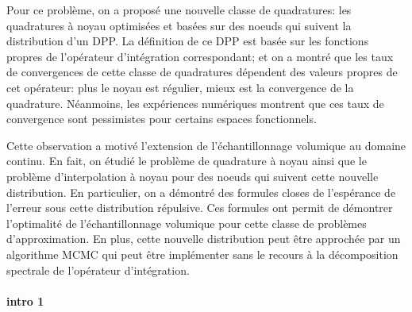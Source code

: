 \documentclass[twoside,11pt]{book}
\numberwithin{theorem}{chapter}
\numberwithin{definition}{chapter}
\numberwithin{proposition}{chapter}
\numberwithin{corollary}{chapter}
\numberwithin{example}{chapter}
\numberwithin{lemma}{chapter}
\numberwithin{assumption}{chapter}
\numberwithin{equation}{chapter}
\numberwithin{figure}{chapter}
\begin{document}
Pour ce problème, on a proposé une nouvelle classe de quadratures: les quadratures à noyau optimisées et  basées sur des noeuds qui suivent la distribution d'un DPP. La définition de ce DPP est basée sur les fonctions propres de l'opérateur d'intégration correspondant; et on a montré que les taux de convergences de cette classe de quadratures dépendent des valeurs propres de cet opérateur: plus le noyau est régulier, mieux est la convergence de la quadrature. Néanmoins, les expériences numériques montrent que ces taux de convergence sont pessimistes pour certains espaces fonctionnels.

Cette observation a motivé l'extension de l'échantillonnage volumique au domaine continu. En fait, on étudié le problème de quadrature à noyau ainsi que le problème d’interpolation à noyau pour des noeuds qui suivent cette nouvelle distribution. En particulier, on a démontré des formules closes de l'espérance de l'erreur sous cette distribution répulsive. Ces formules ont permit de démontrer l'optimalité de l’échantillonnage volumique pour cette classe de problèmes d'approximation. En plus, cette nouvelle distribution peut être approchée par un algorithme MCMC qui peut être implémenter sans le recours à la décomposition spectrale de l'opérateur d'intégration.

\paragraph{intro 1}
\end{document}
